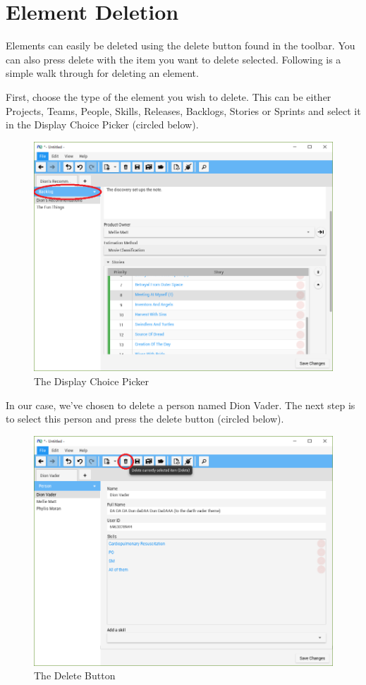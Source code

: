 \section{Element Deletion}

Elements can easily be deleted using the delete button found in the toolbar. You can also press delete with the item you want to delete selected. Following is a simple walk through for deleting an element.

First, choose the type of the element you wish to delete. This can be either Projects, Teams, People, Skills, Releases, Backlogs, Stories or Sprints and select it in the Display Choice Picker (circled below).

\begin{figure}[H]
\centering
\includegraphics[width=\textwidth]{images/screenshots/deletion1.PNG}
\caption{The Display Choice Picker}
\label{fig:new_project}
\end{figure}

In our case, we've chosen to delete a person named Dion Vader. The next step is to select this person and press the delete button (circled below).

\begin{figure}[H]
\centering
\includegraphics[width=\textwidth]{images/screenshots/deletion2.PNG}
\caption{The Delete Button}
\label{fig:new_project}
\end{figure}

